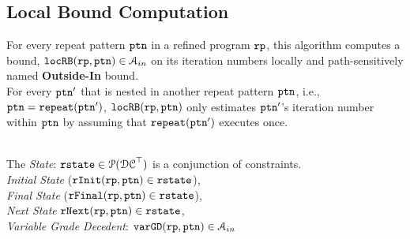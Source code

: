 \subsection{Local Bound Computation}
  For every repeat pattern $\mathtt{ptn}$ in a refined program $\mathtt{rp}$, 
this algorithm
computes a bound, $\mathtt{locRB}(\mathtt{rp}, \mathtt{ptn}) \in \mathcal{A}_{in}$ on its iteration numbers locally and path-sensitively
named \textbf{Outside-In} bound.
\\
For every $\mathtt{ptn}'$ that is nested
in another repeat pattern $\mathtt{ptn}$, i.e., $\mathtt{ptn} = \mathtt{repeat}(\mathtt{ptn}')$,
$\mathtt{locRB}(\mathtt{rp}, \mathtt{ptn})$ only estimates
$\mathtt{ptn}'$'s iteration number within $\mathtt{ptn}$ by assuming that $\mathtt{repeat}(\mathtt{ptn}')$ executes once.

\\
The \emph{State}: 
$\mathtt{rstate} \in \mathcal{P}(\mathcal{DC}^{\top})$ is a conjunction of constraints.
\\
\emph{Initial State} ($\mathtt{rInit}(\mathtt{rp}, \mathtt{ptn}) \in \mathtt{rstate}$), 
\\
\emph{Final State} ($\mathtt{rFinal}(\mathtt{rp}, \mathtt{ptn}) \in \mathtt{rstate}$),
\\
\emph{Next State} $\mathtt{rNext}(\mathtt{rp}, \mathtt{ptn}) \in \mathtt{rstate}$,
\\
\emph{Variable Grade Decedent}: $\mathtt{varGD}(\mathtt{rp}, \mathtt{ptn}) \in \mathcal{A}_{in}$


